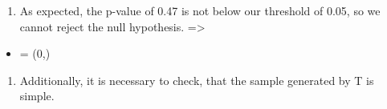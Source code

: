 \documentclass[11pt]{article}
\providecommand{\tightlist}{%
      \setlength{\itemsep}{0pt}\setlength{\parskip}{0pt}}
\begin{document}
    \begin{enumerate}
\def\labelenumi{\arabic{enumi}.}
\setcounter{enumi}{3}
\tightlist
\item
As expected, the p-value of 0.47 is not below our threshold of 0.05, so we cannot reject the null hypothesis.  
=>\end{enumerate}

\begin{itemize}
\tightlist
\item
  = (0,\theta) 
\end{itemize}

    \begin{enumerate}
\def\labelenumi{\arabic{enumi}.}
\setcounter{enumi}{4}
\tightlist
\item
  Additionally, it is necessary to check, that the sample generated by T
  is simple.
\end{enumerate}
\end{document}
